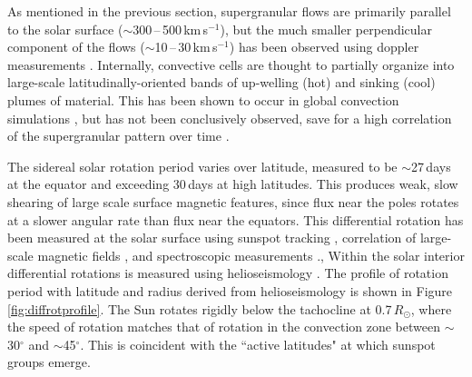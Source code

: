 As mentioned in the previous section, supergranular flows are primarily parallel to the solar surface ($\sim$300\,--\,500\,km\,s$^{-1}$), but the much smaller perpendicular component of the flows ($\sim$10\,--\,30\,km\,s$^{-1}$) has been observed using doppler measurements \citep{Hathaway:2002,Duvall:2010}.
Internally, convective cells are thought to partially organize into large-scale latitudinally-oriented bands of up-welling (hot) and sinking (cool) plumes of material. This has been shown to occur in global convection simulations \citep{Brun:2004}, but has not been conclusively observed, save for a high correlation of the supergranular pattern over time \citep{Miesch:2005}. 



The sidereal solar rotation period varies over latitude, measured to be $\sim$27\,days at the equator and exceeding 30\,days at high latitudes. This produces weak, slow shearing of large scale surface magnetic features, since flux near the poles rotates at a slower angular rate than flux near the equators. This differential rotation has been measured at the solar surface using sunspot tracking \citep{Newton:1951}, correlation of large-scale magnetic fields \citep{Wilcox:1970}, and spectroscopic measurements \citep{Howard:1970}., Within the solar interior differential rotations is measured using helioseismology \citep{Schou:1998}. The profile of rotation period with latitude and radius derived from helioseismology is shown in Figure \ref{fig:diffrotprofile}. The Sun rotates rigidly  below the tachocline at 0.7\,$R_\odot$, where the speed of rotation matches that of rotation in the convection zone between $\sim$30$^{\circ}$ and $\sim$45$^{\circ}$. This is coincident with the ``active latitudes" at which sunspot groups emerge. 

